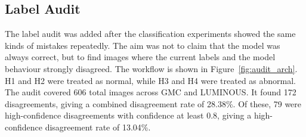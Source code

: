 \documentclass[twocolumn,10pt]{article}
\begin{document}
\subsection{Label Audit}
The label audit was added after the classification experiments showed the same kinds of mistakes repeatedly. The aim was not to claim that the model was always correct, but to find images where the current labels and the model behaviour strongly disagreed. The workflow is shown in Figure~\ref{fig:audit_arch}. H1 and H2 were treated as normal, while H3 and H4 were treated as abnormal. The audit covered 606 total images across GMC and LUMINOUS. It found 172 disagreements, giving a combined disagreement rate of 28.38\%. Of these, 79 were high-confidence disagreements with confidence at least 0.8, giving a high-confidence disagreement rate of 13.04\%.

\begin{table}[H]
\centering
\scriptsize
{}
\caption{Combined GMC and LUMINOUS image audit summary}
\label{tab:audit_summary}
\end{table}

\begin{table}[H]
\centering
\scriptsize
{}
\caption{Class-wise label audit results}
\label{tab:audit_classwise}
\end{table}
\end{document}
